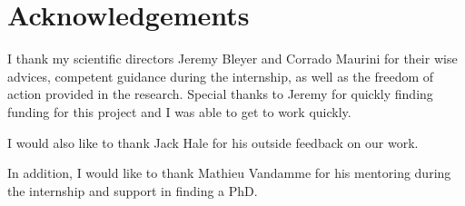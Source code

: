 \documentclass[12pt]{article}
\begin{document}



\section*{\centering Acknowledgements}
\setcounter{page}{2}

I thank my scientific directors Jeremy Bleyer and Corrado Maurini for their wise advices, competent guidance during the internship, as well as the freedom of action provided in the research. Special thanks to Jeremy for quickly finding funding for this project and I was able to get to work quickly.

I would also like to thank Jack Hale for his outside feedback on our work. 

In addition, I would like to thank Mathieu Vandamme for his mentoring during the internship and support in finding a PhD.


\end{document}
